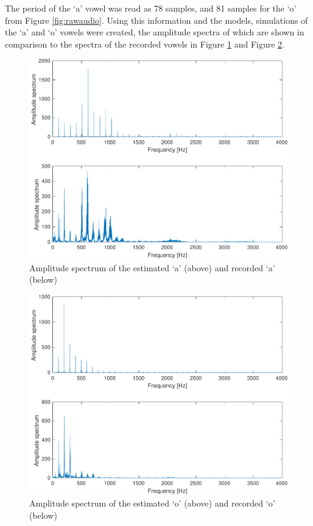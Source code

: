 \documentclass{IEEEtran}
\begin{document}
The period of the `a' vowel was read as 78 samples, and 81 samples for the `o'
from Figure \ref{fig:rawaudio}. Using this information and the models,
simulations of the `a' and `o' vowels were created, the amplitude spectra of
which are shown in comparison to the spectra of the recorded vowels in Figure
\ref{fig:adft} and Figure \ref{fig:odft}.

\begin{figure}[h!]
    \centering
    \captionsetup{justification=centering}
    \includegraphics[width=0.8\columnwidth]{pictures/apreddft.pdf}
    \caption{Amplitude spectrum of the estimated `a' (above) and recorded
    `a' (below)}
    \label{fig:adft}
\end{figure}

\begin{figure}[h!]
    \centering
    \captionsetup{justification=centering}
    \includegraphics[width=0.8\columnwidth]{pictures/opreddft.pdf}
    \caption{Amplitude spectrum of the estimated `o' (above) and recorded
    `o' (below)}
    \label{fig:odft}
\end{figure}
\end{document}
